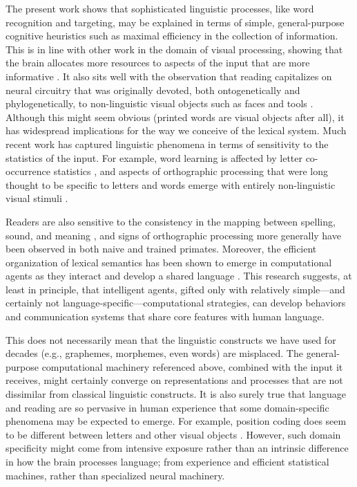 \documentclass[doc,biblatex,floatsintext]{apa7}
\begin{document}
The present work shows that sophisticated linguistic processes, like word recognition and targeting, may be explained in terms of simple, general-purpose cognitive heuristics such as maximal efficiency in the collection of information. This is in line with other work in the domain of visual processing, showing that the brain allocates more resources to aspects of the input that are more informative \parencite{Simoncelli:2001, Hermundstad:2014}. It also sits well with the observation that reading capitalizes on neural circuitry that was originally devoted, both ontogenetically and phylogenetically, to non-linguistic visual objects such as faces and tools \parencite{Dehaene:2011, Hervais:2019}. Although this might seem obvious (printed words are visual objects after all), it has widespread implications for the way we conceive of the lexical system. Much recent work has captured linguistic phenomena in terms of sensitivity to the statistics of the input. For example, word learning is affected by letter co-occurrence statistics \parencite{Chetail:2017, Lelonkiewicz:2020}, and aspects of orthographic processing that were long thought to be specific to letters and words emerge with entirely non-linguistic visual stimuli \parencite{Vidal:2021}.

Readers are also sensitive to the consistency in the mapping between spelling, sound, and meaning \parencite{Marelli:2015, Ulicheva:2020}, and signs of orthographic processing more generally have been observed in both naive \parencite{Rajalingham:2018} and trained \parencite{Grainger:2012} primates. Moreover, the efficient organization of lexical semantics has been shown to emerge in computational agents as they interact and develop a shared language \parencite{Chaabouni:2021}. This research suggests, at least in principle, that intelligent agents, gifted only with relatively simple---and certainly not language-specific---computational strategies, can develop behaviors and communication systems that share core features with human language.

This does not necessarily mean that the linguistic constructs we have used for decades (e.g., graphemes, morphemes, even words) are misplaced. The general-purpose computational machinery referenced above, combined with the input it receives, might certainly converge on representations and processes that are not dissimilar from classical linguistic constructs. It is also surely true that language and reading are so pervasive in human experience that some domain-specific phenomena may be expected to emerge. For example, position coding does seem to be different between letters and other visual objects \parencite{Dunabeitia:2012}. However, such domain specificity might come from intensive exposure rather than an intrinsic difference in how the brain processes language; from experience and efficient statistical machines, rather than specialized neural machinery.
\end{document}
